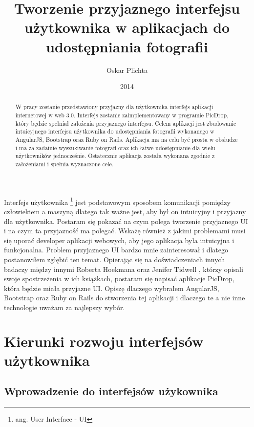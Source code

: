 \documentclass[brudnopis]{xmgr}
\author   {Oskar Plichta}
\title    {Tworzenie przyjaznego interfejsu użytkownika w aplikacjach do udostępniania fotografii }
\date     {2014}
\begin{document}
\begin{abstract}

W pracy zostanie przedstawiony przyjazny dla użytkownika interfejs aplikacji internetowej w web 3.0. Interfejs zostanie zaimplementowany w programie PicDrop,  który będzie spełniał założenia przyjaznego interfejsu. Celem aplikacji jest zbudowanie intuicyjnego interfejsu użytkownika do udostępniania fotografii wykonanego w AngularJS, Bootstrap oraz Ruby on Rails. Aplikacja ma na celu być prosta w obsłudze i ma za zadainie wyszukiwanie fotografi oraz ich łatwe udostępnianie dla wielu użytkowników jednocześnie. Ostatecznie aplikacja została wykonana zgodnie z założeniami i spełnia wyznaczone cele.

\end{abstract}

\maketitle
%
\introduction
Interfejs użytkownika \footnote{ang. User Interface - UI}  jest podstawowym sposobem komunikacji pomiędzy człowiekiem a maszyną dlatego tak ważne jest, aby był on intuicyjny i przyjazny dla użytkownika. 
Postaram się pokazać na czym polega tworzenie przyjaznego UI i na czym ta przyjazność ma polegać.
Wskażę również z jakimi problemami musi się uporać developer aplikacji webowych, aby jego aplikacja była intuicyjna i funkcjonalna. Problem przyjaznego UI bardzo mnie zainteresował i dlatego postanowiłem zgłębić ten temat. Opierając się na  doświadczeniach innych badaczy  między innymi Roberta Hoekmana  \cite {magiaUI} oraz Jenifer Tidwell  \cite {projektowanieUI}, którzy opisali swoje spostrzeżenia w ich książkach, postaram się napisać aplikacje PicDrop, która  będzie miała przyjazne UI. Opiszę dlaczego wybrałem AngularJS, Bootstrap oraz Ruby on Rails do stworzenia tej aplikacji i dlaczego te a nie inne technologie uważam za najlepszy wybór.


\chapter{Kierunki rozwoju interfejsów użytkownika}

\section{Wprowadzenie do interfejsów użykownika}
\end{document}
